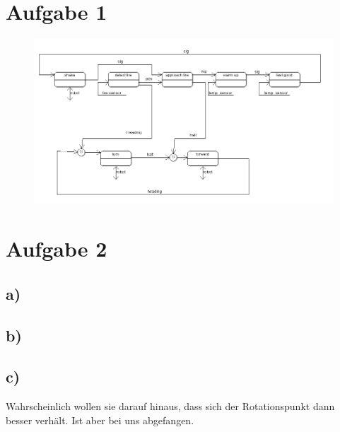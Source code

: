 \documentclass{../Vorlage/mat}
\begin{document}
 \\

\section*{Aufgabe 1}
\begin{figure}[h!]
\centering
\includegraphics[width=\linewidth]{aufgabe1}
\label{fig:aufgabe1}
\end{figure}


\section*{Aufgabe 2}
\subsection*{a)}
\subsection*{b)}
\subsection*{c)}
Wahrscheinlich wollen sie darauf hinaus, dass sich der Rotationspunkt dann besser verhält. Ist aber bei uns abgefangen.
\end{document}
